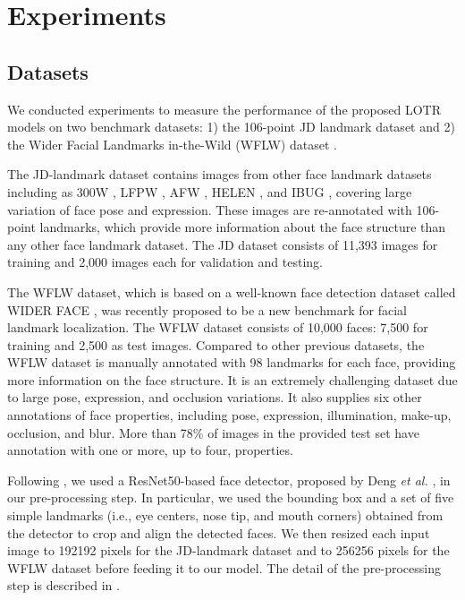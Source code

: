\documentclass[journal]{IEEEtran}
\begin{document}
\section{Experiments}\label{sec:exp}



\subsection{Datasets}\label{subsec:datasets}

We conducted experiments to measure the performance of the proposed LOTR models on two benchmark datasets: 1) the 106-point JD landmark dataset \cite{liu2019} and 2) the Wider Facial Landmarks in-the-Wild (WFLW) dataset \cite{Wu2018}.

The JD-landmark dataset contains images from other face landmark datasets including as 300W \cite{Sagonas2013, Sagonas2016}, LFPW \cite{Belhumeur2013}, AFW \cite{Zhu2012}, HELEN \cite{brandt2012}, and IBUG \cite{sagonas2013b}, covering large variation of face pose and expression. 
These images are re-annotated with 106-point landmarks, which provide more information about the face structure than any other face landmark dataset.  
The JD dataset consists of 11,393 images for training and 2,000 images each for validation and testing. 

The WFLW dataset, which is based on a well-known face detection dataset called WIDER FACE \cite{yang2016wider}, was recently proposed to be a new benchmark for facial landmark localization.
The WFLW dataset consists of 10,000 faces: 7,500 for training and 2,500 as test images. 
Compared to other previous datasets, the WFLW dataset is manually annotated with 98 landmarks for each face, providing more information on the face structure. 
It is an extremely challenging dataset due to large pose, expression, and occlusion variations.
It also supplies six other annotations of face properties, including pose, expression, illumination, make-up, occlusion, and blur. 
More than 78\% of images in the provided test set have annotation with one or more, up to four, properties.

Following \cite{earp2021sub}, we used a ResNet50-based face detector, proposed by Deng \textit{et al.} \cite{deng2019}, in our pre-processing step. 
In particular, we used the bounding box and a set of five simple landmarks (i.e., eye centers, nose tip, and mouth corners) obtained from the detector to crop and align the detected faces.
We then resized each input image to 192192 pixels for the JD-landmark dataset and to 256256 pixels for the WFLW dataset before feeding it to our model.
The detail of the pre-processing step is described in \cite{earp2021sub}.
\end{document}
